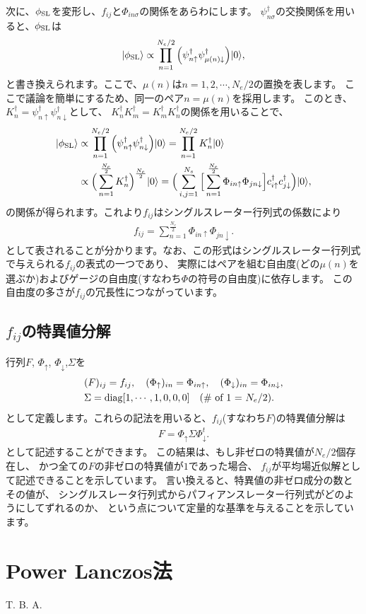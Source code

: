 次に、$\phi_{\rm SL}$を変形し、$f_{ij}$と$\Phi_{in\sigma}$の関係をあらわにします。
$\psi^{\dagger}_{n\sigma}$の交換関係を用いると、$\phi_{\rm SL}$は
\begin{align}
|\phi_{\rm SL}\rangle \propto \prod_{n=1}^{N_{e}/2}\Big(\psi_{n\uparrow}^{\dagger}\psi_{\mu(n)\downarrow}^{\dagger}\Big)|0\rangle,
\end{align}
と書き換えられます。ここで、$\mu(n)$は$n= 1, 2, \cdots, N_{e}/2$の置換を表します。
ここで議論を簡単にするため、同一のペア$n=\mu(n)$を採用します。
このとき、$K_{n}^{\dagger}=\psi_{n\uparrow}^{\dagger}\psi_{n\downarrow}^{\dagger}$として、
$K_{n}^{\dagger}K_{m}^{\dagger}=K_{m}^{\dagger}K_{n}^{\dagger}$の関係を用いることで、
\begin{align}
|\phi_{\rm SL}\rangle &\propto \prod_{n=1}^{N_{e}/2}\Big(\psi_{n\uparrow}^{\dagger}\psi_{n\downarrow}^{\dagger}\Big)|0\rangle
=\prod_{n=1}^{N_{e}/2} K_{n}^{\dagger}|0\rangle \\
&\propto\Big(\sum_{n=1}^{\frac{N_{e}}{2}}K_{n}^{\dagger}\Big)^{\frac{N_{e}}{2}} |0\rangle
=\Big(\sum_{i,j=1}^{N_{s}}\Big[\sum_{n=1}^{\frac{N_{e}}{2}}\Phi_{in\uparrow}\Phi_{jn\downarrow}\Big]
c_{i\uparrow}^{\dagger}c_{j\downarrow}^{\dagger}\Big)|0\rangle,
\end{align}
の関係が得られます。これより$f_{ij}$はシングルスレーター行列式の係数により
\begin{align}
f_{ij}=\sum_{n=1}^{\frac{N_{e}}{2}}\Phi_{in\uparrow}\Phi_{jn\downarrow}.
\end{align}
として表されることが分かります。なお、この形式はシングルスレーター行列式で与えられる$f_{ij}$の表式の一つであり、
実際にはペアを組む自由度(どの$\mu(n)$を選ぶか)およびゲージの自由度(すなわち$\Phi$の符号の自由度)に依存します。
この自由度の多さが$f_{ij}$の冗長性につながっています。

\subsection{$f_{ij}$の特異値分解}
行列$F$, $\Phi_{\uparrow}$, $\Phi_{\downarrow}$,$\Sigma$を
\begin{align}
&(F)_{ij}=f_{ij},~~~ 
(\Phi_{\uparrow})_{in}=\Phi_{in\uparrow},~~~ 
(\Phi_{\downarrow})_{in}=\Phi_{in\downarrow}, \\
&\Sigma={\rm diag}[1,\cdots,1,0,0,0]~~~\text{({\rm \# of 1} = $N_{e}/2$)}.
\end{align}
として定義します。これらの記法を用いると、$f_{ij}$(すなわち$F$)の特異値分解は
\begin{align}
F=\Phi_{\uparrow}\Sigma\Phi_{\downarrow}^{t}.
\end{align}
として記述することができます。
この結果は、もし非ゼロの特異値が$N_{e}/2$個存在し、
かつ全ての$F$の非ゼロの特異値が$1$であった場合、
$f_{ij}$が平均場近似解として記述できることを示しています。
言い換えると、特異値の非ゼロ成分の数とその値が、
シングルスレータ行列式からパフィアンスレーター行列式がどのようにしてずれるのか、
という点について定量的な基準を与えることを示しています。

\section{Power Lanczos法}
T. B. A.

